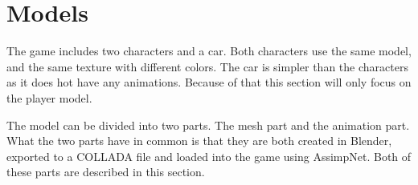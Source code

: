 \section{Models} \label{sec:theory_theory_models}
The game includes two characters and a car.
Both characters use the same model, and the same texture with different colors.
The car is simpler than the characters as it does hot have any animations.
Because of that this section will only focus on the player model.

The model can be divided into two parts.
The mesh part and the animation part.
What the two parts have in common is that they are both created in Blender, exported to a COLLADA file and loaded into the game using AssimpNet.
Both of these parts are described in this section.



